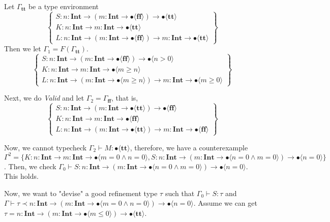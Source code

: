 \documentclass[runningheads]{llncs}
\newcommand\COL{\mathbin{:}}
\newcommand \true {\textbf{tt}}
\newcommand \false {\textbf{ff}}
\newcommand \stypeint {\textbf{Int}}
\newcommand \stypebool {\bullet}
\newcommand \typeint[1]{{#1} : \stypeint}
\newcommand \typebool[1]{\stypebool \langle #1 \rangle}
\newcommand {\rvalid} {\emph{Valid}}
\begin{document}
Let \( \Gamma_\true \) be a type environment
\[
    \left\{
    \begin{array}{l}
        S \COL \typeint{n} \to(\typeint{m} \to \typebool{\false}) \to
        \typebool{\true}\\
        K \COL \typeint{n} \to \typeint{m} \to \typebool{\true}\\
        L \COL \typeint{n} \to (\typeint{m} \to \typebool{\false}) \to
        \typeint{m} \to \typebool{\true}
    \end{array}
    \right\}
\]
Then we let \( \Gamma_1 = F(\Gamma_\true) \).
\[
    \left\{
    \begin{array}{l}
        S \COL \typeint{n} \to(\typeint{m} \to \typebool{\false}) \to
        \typebool{n > 0}\\
        K \COL \typeint{n} \to \typeint{m} \to \typebool{m \geq n}\\
        L \COL \typeint{n} \to (\typeint{m} \to \typebool{m \geq n}) \to
        \typeint{m} \to \typebool{m \geq 0}
    \end{array}
    \right\}
\]

Next, we do \rvalid{} and let \( \Gamma_2 = \Gamma_\false \), that is,
\[
    \left\{
    \begin{array}{l}
        S \COL \typeint{n} \to(\typeint{m} \to \typebool{\true}) \to
        \typebool{\false}\\
        K \COL \typeint{n} \to \typeint{m} \to \typebool{\false}\\
        L \COL \typeint{n} \to (\typeint{m} \to \typebool{\true}) \to
        \typeint{m} \to \typebool{\false}
    \end{array}
    \right\}
\]


Now, we cannot typecheck \( \Gamma_2 \vdash M \COL \typebool{\true} \),
therefore, we have a counterexample \( \Gamma^2 = \{
K \COL \typeint{n} \to \typeint{m} \to \typebool{m = 0 \land n = 0},
S \COL \typeint{n} \to (\typeint{m} \to
\typebool{n = 0 \land m = 0}) \to \typebool{n = 0} \} \).
Then, we check \( \Gamma_0 \vdash S \COL \typeint{n} \to (\typeint{m} \to
\typebool{n = 0 \land m = 0}) \to \typebool{n = 0} \).
This holds.

Now, we want to "devise" a good refinement type \( \tau \) such that
\( \Gamma_0 \vdash S \COL \tau \) and \( \Gamma \vdash \tau \prec \typeint{n}
\to (\typeint{m} \to \typebool{m = 0 \land n = 0}) \to \typebool{n = 0} \).
Assume we can get \( \tau = \typeint{n} \to (\typeint{m} \to \typebool{m \leq
0}) \to \typebool{\true} \).
\end{document}
